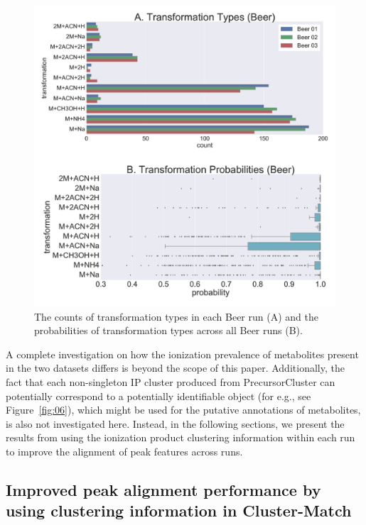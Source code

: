 \begin{figure}[!htbp]
\centering
\includegraphics[width=1.0\linewidth]{05-precursor-cluster/figures/trans_Beer.pdf}
\caption{\label{fig:trans-beer} The counts of transformation types in each Beer run (A) and the probabilities of transformation types across all Beer runs (B).}
\end{figure}

A complete investigation on how the ionization prevalence of metabolites present in the two datasets differs is beyond the scope of this paper. Additionally, the fact that each non-singleton IP cluster produced from PrecursorCluster can potentially correspond to a potentially identifiable object (for e.g., see Figure~\ref{fig:06}), which might be used for the putative annotations of metabolites, is also not investigated here. Instead, in the following sections, we present the results from using the ionization product clustering information within each run to improve the alignment of peak features across runs. 

\subsection{Improved peak alignment performance by using clustering information in Cluster-Match}

